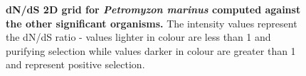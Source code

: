\documentclass{article}
\begin{document}
\begin{figure}[H]
\centering
{}
\caption{\textbf{dN/dS 2D grid for \textit{Petromyzon marinus} computed against the other significant organisms.} The intensity values represent the dN/dS ratio - values lighter in colour are less than 1 and purifying selection while values darker in colour are greater than 1 and represent positive selection.}
\label{sup_fig_32}
\end{figure}
\end{document}

